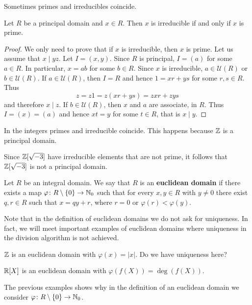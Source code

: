 Sometimes primes and irreducibles coincide. 

\begin{proposition}
	Let $R$ be a principal domain and $x\in R$. 
	Then $x$ is irreducible if and only if $x$ is prime. 	
\end{proposition}

\begin{proof}
	We only need to prove that if $x$ is irreducible, then $x$ is prime. Let us
	assume that $x\mid yz$. Let $I=(x,y)$. Since $R$ is principal, $I=(a)$ for some $a\in R$. In particular, $x=ab$ for some $b\in R$. Since $x$ is irreducible, $a\in\mathcal{U}(R)$ or
	$b\in\mathcal{U}(R)$. If $a\in\mathcal{U}(R)$, then $I=R$ and hence 
	$1=xr+ys$ for some $r,s\in R$. Thus
	\[
	z=z1=z(xr+ys)=zxr+zys
	\]
	and therefore $x\mid z$. If $b\in\mathcal{U}(R)$, then $x$ and $a$ are associate, 
	in $R$. Thus $I=(x)=(a)$ and hence $xt=y$ for some $t\in R$, that is $x\mid y$.  
\end{proof}

In the integers primes and irreducible coincide. This happens 
because $\mathbb{Z}$ is a principal domain.

\begin{example}
	Since $\mathbb{Z}[\sqrt{-3}]$ have irreducible elements that are not prime, it follows that
	$\mathbb{Z}[\sqrt{-3}]$ is not a principal domain.
\end{example}

\begin{definition}
	Let $R$ be an integral domain. We say that $R$ is an \textbf{euclidean domain}
	if there exists a map $\varphi\colon R\setminus\{0\}\to\mathbb{N}_0$ such that
	for every $x,y\in R$ with $y\ne 0$ there exist $q,r\in R$ such that 
	$x=qy+r$, where $r=0$ or $\varphi(r)<\varphi(y)$. 
\end{definition}

Note that in the definition of euclidean domains we do not ask for uniqueness. In fact, 
we will meet important examples of euclidean domains where uniqueness
in the division algorithm is not achieved. 

\begin{example}
	$\mathbb{Z}$ is an euclidean domain with $\varphi(x)=|x|$. Do we have uniqueness here? 	
\end{example}

\begin{example}
	$\mathbb{R}[X]$ is an euclidean domain with $\varphi(f(X))=\deg(f(X))$. 	
\end{example}

The previous examples shows why in the definition of an euclidean domain 
we consider $\varphi\colon R\setminus\{0\}\to\mathbb{N}_0$. 

